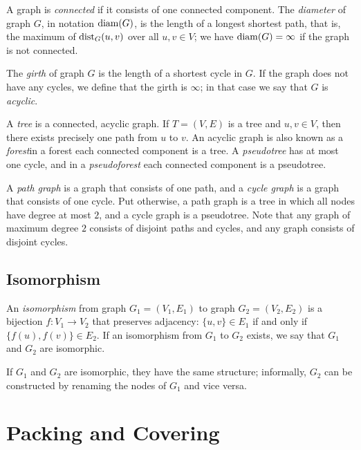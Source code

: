 A graph is \emph{connected} if it consists of one connected component. The \emph{diameter} of graph $G$, in notation $\operatorname{diam}(G)$, is the length of a longest shortest path, that is, the maximum of $\operatorname{dist}_G(u,v)$ over all $u, v \in V$; we have $\operatorname{diam}(G) = \infty$ if the graph is not connected.

The \emph{girth} of graph $G$ is the length of a shortest cycle in $G$. If the graph does not have any cycles, we define that the girth is $\infty$; in that case we say that $G$ is \emph{acyclic}.

A \emph{tree} is a connected, acyclic graph. If $T = (V,E)$ is a tree and $u,v \in V$, then there exists precisely one path from $u$ to $v$. An acyclic graph is also known as a \emph{forest}\mydash in a forest each connected component is a tree. A \emph{pseudotree} has at most one cycle, and in a \emph{pseudoforest} each connected component is a pseudotree.

A \emph{path graph} is a graph that consists of one path, and a \emph{cycle graph} is a graph that consists of one cycle. Put otherwise, a path graph is a tree in which all nodes have degree at most $2$, and a cycle graph is a  pseudotree. Note that any graph of maximum degree $2$ consists of disjoint paths and cycles, and any  graph consists of disjoint cycles.


\subsection{Isomorphism}

An \emph{isomorphism} from graph $G_1 = (V_1,E_1)$ to graph $G_2 = (V_2,E_2)$ is a bijection $f\colon V_1 \to V_2$ that preserves adjacency: $\{u,v\} \in E_1$ if and only if $\{f(u),f(v)\} \in E_2$. If an isomorphism from $G_1$ to $G_2$ exists, we say that $G_1$ and $G_2$ are isomorphic.

If $G_1$ and $G_2$ are isomorphic, they have the same structure; informally, $G_2$ can be constructed by renaming the nodes of $G_1$ and vice versa.


\section{Packing and Covering}\label{sec:packingcovering}

